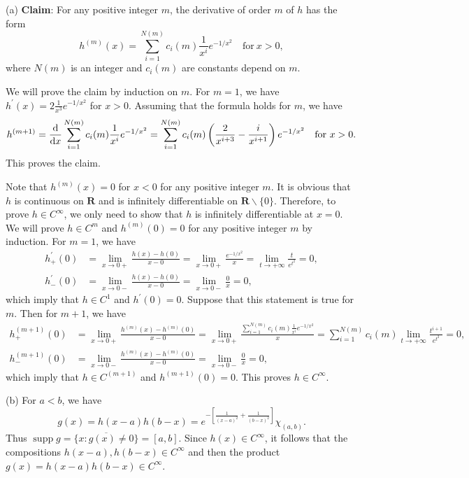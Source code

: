 \begin{exercise}{9.4}\label{94}
  (a) \textbf{Claim}: For any positive integer $m$, the derivative of order $m$ of $h$ has the form $$h^{(m)}(x)=\sum_{i=1}^{N(m)}c_i(m)\frac{1}{x^i}e^{-1/x^2}\quad \text{for}\ x>0,$$
  where $N(m)$ is an integer and $c_i(m)$ are constants depend on $m$.
  
  We will prove the claim by induction on $m$. For $m=1$, we have $h^\prime(x)=2\frac{1}{x^3}e^{-1/x^2}$ for $x>0$. Assuming that the formula holds for $m$, we have
  $$h^{(m+1)}=\frac{\mathrm{d}}{\mathrm{d} x}\sum_{i=1}^{N(m)}c_i(m)\frac{1}{x^i}e^{-1/x^2}=\sum_{i=1}^{N(m)}c_i(m)\left(\frac{2}{x^{i+3}}-\frac{i}{x^{i+1}}\right)e^{-1/x^2}\quad \text{for}\ x>0.$$
  This proves the claim.
  
 Note that $h^{(m)}(x)=0$ for $x<0$ for any positive integer $m$. It is obvious that $h$ is continuous on $\mathbf{R}$ and is infinitely differentiable on $\mathbf{R}\backslash\{0\}$. Therefore, to prove $h\in C^\infty$, we only need to show that $h$ is infinitely differentiable at $x=0$. We will prove $h\in C^m$ and $h^{(m)}(0)=0$ for any positive integer $m$ by induction. For $m=1$, we have
  \begin{equation*}
      \begin{aligned}
         h_+^{\prime}(0)&=\lim_{x\to 0+}\frac{h(x)-h(0)}{x-0}=\lim_{x\to 0+}\frac{e^{-1/x^2}}{x}=\lim_{t\to+\infty}\frac{t}{e^{t^2}}=0,\\
             h_-^{\prime}(0)&=\lim_{x\to 0-}\frac{h(x)-h(0)}{x-0}=\lim_{x\to 0-}\frac{0}{x}=0,
      \end{aligned}
  \end{equation*}
  which imply that $h\in C^1$ and $h^\prime(0)=0$. Suppose that this statement is true for $m$. Then for $m+1$, we have 
  \begin{equation*}
      \begin{aligned}
         h_+^{(m+1)}(0)&=\lim_{x\to 0+}\frac{h^{(m)}(x)-h^{(m)}(0)}{x-0}= \lim_{x\to 0+}\frac{\sum_{i=1}^{N(m)}c_i(m)\frac{1}{x^i}e^{-1/x^2}}{x}=\sum_{i=1}^{N(m)}c_i(m)\lim_{t\to+\infty}\frac{t^{i+1}}{e^{t^2}}=0,\\
          h_-^{(m+1)}(0)&=\lim_{x\to 0-}\frac{h^{(m)}(x)-h^{(m)}(0)}{x-0}=\lim_{x\to 0-}\frac{0}{x}=0,
      \end{aligned}
  \end{equation*}
  which imply that $h\in C^{(m+1)}$ and $h^{(m+1)}(0)=0$. This proves $h\in C^\infty$.
  
  (b) For $a<b$, we have $$g(x)=h(x-a)h(b-x)=e^{-\left[\frac{1}{(x-a)^2}+\frac{1}{(b-x)^2}\right]}\chi_{(a,b)}.$$ Thus $\operatorname{supp} g=\overline{\{x:g(x)\neq 0\}}=[a,b]$. Since $h(x)\in C^\infty$, it follows that the compositions $h(x-a),h(b-x)\in C^\infty$ and then the product $g(x)=h(x-a)h(b-x)\in C^\infty$.
  

\end{exercise}
